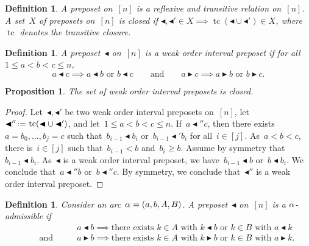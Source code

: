 \documentclass[leqno, 12pt]{amsart}
\numberwithin{equation}{section}
\newcommand{\darkblue}{\color{darkblue}} %
\newcommand{\defn}[1]{\textsl{\darkblue #1}} %
\DeclareMathOperator{\tc}{tc}
\newcommand{\eqdef}{\mbox{\,\raisebox{0.2ex}{\scriptsize\ensuremath{\mathrm:}}\ensuremath{=}\,}} %
\numberwithin{equation}{section}
\newtheorem{prop}[thm]{Proposition}
\newtheorem{defi}[thm]{Definition}
\theoremstyle{remark}
\begin{document}
\begin{defi}
A \defn{preposet} on~$[n]$ is a reflexive and transitive relation on~$[n]$.
A set~$X$ of preposets on~$[n]$ is \defn{closed} if ${\blacktriangleleft}, {\blacktriangleleft'} \in X \implies \tc({\blacktriangleleft} \cup {\blacktriangleleft'}) \in X$, where~$\tc$ denotes the transitive closure.
\end{defi}

\begin{defi}
A preposet~$\blacktriangleleft$ on~$[n]$ is a \defn{weak order interval preposet} if  for all~$1 \le a<b<c \le n$,
\[
a \blacktriangleleft c \implies a \blacktriangleleft b \text{ or } b \blacktriangleleft c
\qquad\text{and}\qquad
a \blacktriangleright c \implies a \blacktriangleright b \text{ or } b \blacktriangleright c.
\]
\end{defi}

\begin{prop}
\label{prop:weakOrderIntervalPreposets}
The set of weak order interval preposets is closed.
\end{prop}

\begin{proof}
Let~${\blacktriangleleft}, {\blacktriangleleft'}$ be two weak order interval preposets on~$[n]$, let~${\blacktriangleleft''} \eqdef  \tc({\blacktriangleleft} \cup {\blacktriangleleft'})$, and let~$1 \le a<b<c \le n$.
If~$a \blacktriangleleft'' c$, then there exists~$a = b_0, \dots, b_j = c$ such that~$b_{i-1} \blacktriangleleft b_i$ or~$b_{i-1} \blacktriangleleft' b_i$ for all~$i \in [j]$.
As~$a < b < c$, there is~$i \in [j]$ such that~$b_{i-1} < b$ and~$b_i \ge b$.
Assume by symmetry that~$b_{i-1} \blacktriangleleft b_i$.
As~$\blacktriangleleft$ is a weak order interval preposet, we have~$b_{i-1} \blacktriangleleft b$ or~$b \blacktriangleleft b_i$.
We conclude that~$a \blacktriangleleft'' b$ or~$b \blacktriangleleft'' c$.
By symmetry, we conclude that~$\blacktriangleleft''$ is a weak order interval preposet.
\end{proof}

\begin{defi}
Consider an arc~$\alpha = (a, b, A, B)$.
A preposet~$\blacktriangleleft$ on~$[n]$ is a \defn{$\alpha$-admissible} if
\begin{align*}
& a \blacktriangleleft b \implies \text{there exists~$k \in A$ with~$k \blacktriangleleft b$ or~$k \in B$ with~$a \blacktriangleleft k$} \\
\qquad\text{and}\qquad &
a \blacktriangleright b \implies \text{there exists~$k \in A$ with~$k \blacktriangleright b$ or~$k \in B$ with~$a \blacktriangleright k$}.
\end{align*}
\end{defi}
\end{document}
